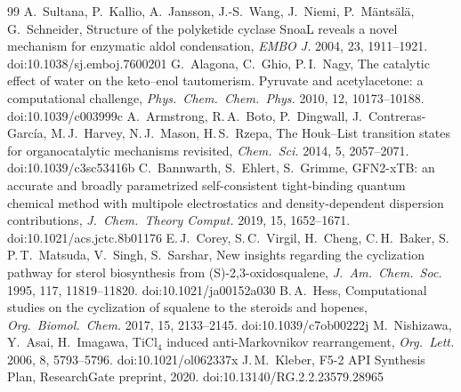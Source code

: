 \documentclass[11pt]{article}
\begin{document}
\begin{thebibliography}{99}
 A.\ Sultana, P.\ Kallio, A.\ Jansson, J.-S.\ Wang, J.\ Niemi, P.\ Mäntsälä, G.\ Schneider, Structure of the polyketide cyclase SnoaL reveals a novel mechanism for enzymatic aldol condensation, \textit{EMBO J.} 2004, 23, 1911--1921. doi:10.1038/sj.emboj.7600201
 G.\ Alagona, C.\ Ghio, P.\,I.\ Nagy, The catalytic effect of water on the keto--enol tautomerism. Pyruvate and acetylacetone: a computational challenge, \textit{Phys.\ Chem.\ Chem.\ Phys.} 2010, 12, 10173--10188. doi:10.1039/c003999c
 A.\ Armstrong, R.\,A.\ Boto, P.\ Dingwall, J.\ Contreras-García, M.\,J.\ Harvey, N.\,J.\ Mason, H.\,S.\ Rzepa, The Houk--List transition states for organocatalytic mechanisms revisited, \textit{Chem.\ Sci.} 2014, 5, 2057--2071. doi:10.1039/c3sc53416b
 C.\ Bannwarth, S.\ Ehlert, S.\ Grimme, GFN2-xTB: an accurate and broadly parametrized self-consistent tight-binding quantum chemical method with multipole electrostatics and density-dependent dispersion contributions, \textit{J.\ Chem.\ Theory Comput.} 2019, 15, 1652--1671. doi:10.1021/acs.jctc.8b01176
 E.\,J.\ Corey, S.\,C.\ Virgil, H.\ Cheng, C.\,H.\ Baker, S.\,P.\,T.\ Matsuda, V.\ Singh, S.\ Sarshar, New insights regarding the cyclization pathway for sterol biosynthesis from (S)-2,3-oxidosqualene, \textit{J.\ Am.\ Chem.\ Soc.} 1995, 117, 11819--11820. doi:10.1021/ja00152a030
 B.\,A.\ Hess, Computational studies on the cyclization of squalene to the steroids and hopenes, \textit{Org.\ Biomol.\ Chem.} 2017, 15, 2133--2145. doi:10.1039/c7ob00222j
 M.\ Nishizawa, Y.\ Asai, H.\ Imagawa, TiCl$_4$ induced anti-Markovnikov rearrangement, \textit{Org.\ Lett.} 2006, 8, 5793--5796. doi:10.1021/ol062337x
 J.\,M.\ Kleber, F5-2 API Synthesis Plan, ResearchGate preprint, 2020. doi:10.13140/RG.2.2.23579.28965
\end{thebibliography}
\end{document}
